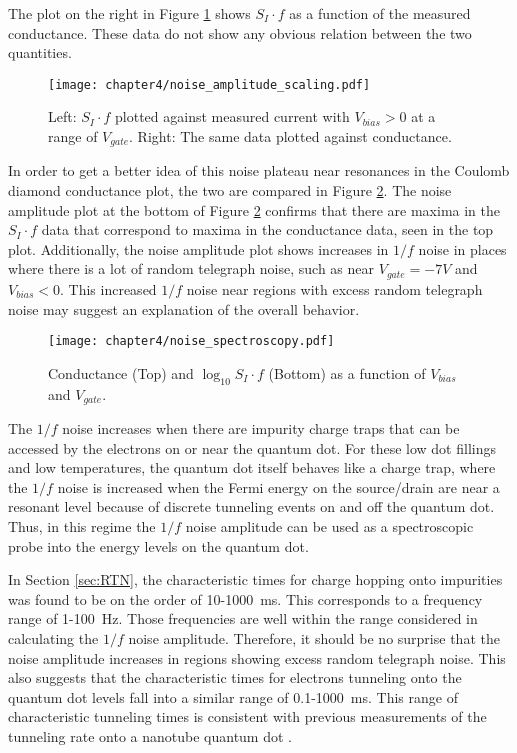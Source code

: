 The plot on the right in Figure \ref{fig:noise_current} shows $S_I \cdot f$ as a function of the measured conductance. These data do not show any obvious relation between the two quantities. 

\begin{figure}
    \centering
    \texttt{[image: chapter4/noise\_amplitude\_scaling.pdf]}
    \caption{Left: $S_I \cdot f$ plotted against measured current with $V_{bias}>0$ at a range of $V_{gate}$. Right: The same data plotted against conductance.}
    \label{fig:noise_current}
\end{figure}

In order to get a better idea of this noise plateau near resonances in the Coulomb diamond conductance plot, the two are compared in Figure \ref{fig:noise_spectroscopy}. The noise amplitude plot at the bottom of Figure \ref{fig:noise_spectroscopy} confirms that there are maxima in the $S_I \cdot f$ data that correspond to maxima in the conductance data, seen in the top plot. Additionally, the noise amplitude plot shows increases in $1/f$ noise in places where there is a lot of random telegraph noise, such as near $V_{gate} = -7V$ and $V_{bias}<0$. This increased $1/f$ noise near regions with excess random telegraph noise may suggest an explanation of the overall behavior. 

\begin{figure}
    \centering
    \texttt{[image: chapter4/noise\_spectroscopy.pdf]}
    \caption{Conductance (Top) and $\log_{10}{S_I \cdot f}$ (Bottom) as a function of $V_{bias}$ and $V_{gate}$.}
    \label{fig:noise_spectroscopy}
\end{figure}

The $1/f$ noise increases when there are impurity charge traps that can be accessed by the electrons on or near the quantum dot. For these low dot fillings and low temperatures, the quantum dot itself behaves like a charge trap, where the $1/f$ noise is increased when the Fermi energy on the source/drain are near a resonant level because of discrete tunneling events on and off the quantum dot. Thus, in this regime the $1/f$ noise amplitude can be used as a spectroscopic probe into the energy levels on the quantum dot.

In Section \ref{sec:RTN}, the characteristic times for charge hopping onto impurities was found to be on the order of 10-\SI{1000}{\milli\second}. This corresponds to a frequency range of 1-\SI{100}{\hertz}. Those frequencies are well within the range considered in calculating the $1/f$ noise amplitude. Therefore, it should be no surprise that the noise amplitude increases in regions showing excess random telegraph noise. This also suggests that the characteristic times for electrons tunneling onto the quantum dot levels fall into a similar range of 0.1-\SI{1000}{\milli\second}. This range of characteristic tunneling times is consistent with previous measurements of the tunneling rate onto a nanotube quantum dot \cite{Gotz2008}. 

